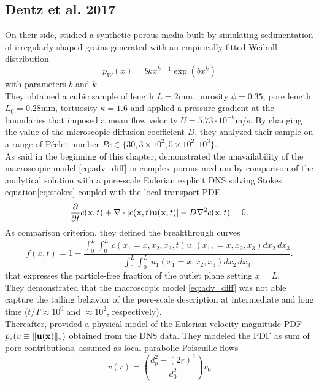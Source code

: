 \subsection{Dentz et al. 2017}
On their side, \citet{Dentz2017} studied a synthetic porous media built by simulating sedimentation of irregularly shaped grains generated with an empirically fitted Weibull distribution
\begin{equation}\label{eq:weibull}
	p_W(x)=bkx^{k-1}\exp(bx^k)
\end{equation}
with parameters $b$ and $k$.\\
They obtained a cubic sample of length $L=2$mm, porosity $\phi=0.35$, pore length $L_0=0.28$mm, tortuosity $\kappa=1.6$ and applied a pressure gradient at the boundaries that imposed a mean flow velocity $U=5.73\cdot10^{-6}$m/s. By changing the value of the microscopic diffusion coefficient $D$, they analyzed their sample on a range of Péclet number $Pe\in\{30, 3\times 10^2, 5\times 10^2, 10^3\}$.\\
As said in the beginning of this chapter, \citeauthor{Dentz2017} demonstrated the unavailability of the macroscopic model \eqref{eq:adv_diff} in complex porous medium by comparison of the analytical solution with a pore-scale Eulerian explicit DNS solving Stokes equation\eqref{eq:stokes} coupled with the local transport PDE
\begin{equation}\label{eq:micro_adv_diff}
\pdv{t}c(\textbf{x},t)+\nabla\cdot[c(\textbf{x},t)\textbf{u}(\textbf{x},t)]-D \nabla^2c(\textbf{x},t)=0.
\end{equation}
As comparison criterion, they defined the breakthrough curves
\begin{equation}
f(x,t)=1-\frac{\int_0^L\int_0^L\,c(x_1=x, x_2,x_3,t)u_1(x_1,=x,x_2,x_3)dx_2\,dx_3}{\int_0^L\int_0^L\,u_1(x_1=x,x_2,x_3)dx_2\,dx_3}.
\label{eq:DentzBTC}
\end{equation}
that expresses the particle-free fraction of the outlet plane setting $x=L$.\\
They demonstrated that the macroscopic model \eqref{eq:adv_diff} was not able capture the tailing behavior of the pore-scale description at intermediate and long time ($t/T\approx 10^0$ and $\approx 10^2$, respectively).\\
Thereafter, \citeauthor{Dentz2017} provided a physical model of the Eulerian velocity magnitude PDF $p_e(v\equiv\norm{\textbf{u}(\textbf{x})}_2)$  obtained from the DNS data. 
They modeled the PDF as sum of pore contributions, assumed as local parabolic Poiseuille flows 
\begin{equation}\label{eq:dentz_poiseuille}
v(r)=\left(\frac{d_p^2-(2r)^2}{d_0^2}\right)v_0
\end{equation}
